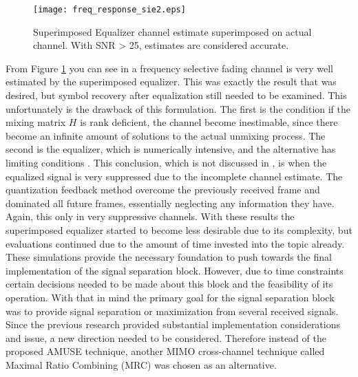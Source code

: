 \begin{figure}[!ht]\label{fig:sie_freq}
\centering
\texttt{[image: freq\_response\_sie2.eps]}
\caption{Superimposed Equalizer channel estimate superimposed on actual channel.  With SNR > 25, estimates are considered accurate.}
\end{figure}

%

From Figure \ref{fig:sie_freq} you can see in a frequency selective fading channel is very well estimated by the superimposed equalizer.  This was exactly the result that was desired, but symbol recovery after equalization still needed to be examined. This unfortunately is the drawback of this formulation.  The first is the condition if the mixing matrix \(H\) is rank deficient, the channel become inestimable,  since there become an infinite amount of solutions to the actual unmixing process.  The second is the equalizer, which is numerically intensive, and the alternative has limiting conditions \cite{Ghogho}.  This conclusion, which is not discussed in \cite{Ghogho}, is when the equalized signal is very suppressed due to the incomplete channel estimate.  The quantization feedback method overcome the previously received frame and dominated all future frames, essentially neglecting any information they have.  Again, this only in very suppressive channels.  With these results the superimposed equalizer started to become less desirable due to its complexity, but evaluations continued due to the amount of time invested into the topic already.\\




These simulations provide the necessary foundation to push towards the final implementation of the signal separation block.  However, due to time constraints certain decisions needed to be made about this block and the feasibility of its operation.  With that in mind the primary goal for the signal separation block was to provide signal separation or maximization from several received signals.  Since the previous research provided substantial implementation considerations and issue, a new direction needed to be considered.  Therefore instead of the proposed AMUSE \cite{AMUSE} technique, another MIMO cross-channel technique called Maximal Ratio Combining (MRC) was chosen as an alternative.\\

